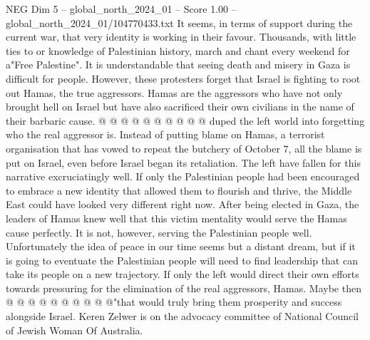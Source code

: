\begin{textsample}{NEG Dim 5 – global\_north\_2024\_01 – Score 1.00 – global\_north\_2024\_01/104770433.txt}
It seems, in terms of support during the current war, that very identity is working in their favour.
Thousands, with little ties to or knowledge of Palestinian history, march and chant every weekend for a"Free Palestine".
It is understandable that seeing death and misery in Gaza is difficult for people.
However, these protesters forget that Israel is fighting to root out Hamas, the true aggressors.
Hamas are the aggressors who have not only brought hell on Israel but have also sacrificed their own civilians in the name of their barbaric cause. @ @ @ @ @ @ @ @ @ @ duped the left world into forgetting who the real aggressor is.
Instead of putting blame on Hamas, a terrorist organisation that has vowed to repeat the butchery of October 7, all the blame is put on Israel, even before Israel began its retaliation.
The left have fallen for this narrative excruciatingly well.
If only the Palestinian people had been encouraged to embrace a new identity that allowed them to flourish and thrive, the Middle East could have looked very different right now.
After being elected in Gaza, the leaders of Hamas knew well that this victim mentality would serve the Hamas cause perfectly.
It is not, however, serving the Palestinian people well.
Unfortunately the idea of peace in our time seems but a distant dream, but if it is going to eventuate the Palestinian people will need to find leadership that can take its people on a new trajectory.
If only the left would direct their own efforts towards pressuring for the elimination of the real aggressors, Hamas.
Maybe then @ @ @ @ @ @ @ @ @ @"that would truly bring them prosperity and success alongside Israel.
Keren Zelwer is on the advocacy committee of National Council of Jewish Woman Of Australia.

\end{textsample}
